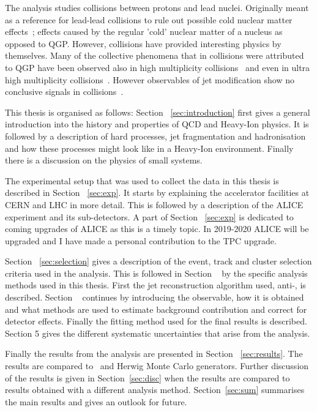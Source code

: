 The analysis studies collisions between protons and lead nuclei. Originally meant as a reference for lead-lead collisions to rule out possible cold nuclear matter effects~\cite{Connors:2017ptx}; effects caused by the regular 'cold' nuclear matter of a nucleus as opposed to QGP. However, \pPb collisions have provided interesting physics by themselves. Many of the collective phenomena that in \PbPb collisions were attributed to QGP have been observed also in high multiplicity \pPb collisions~\cite{Nagle:2018nvi} and even in ultra high multiplicity \pp collisions~\cite{Nagle:2018nvi}. However observables of jet modification show no conclusive signals in \pPb collisions~\cite{Connors:2017ptx,Nagle:2018nvi}. %

This thesis is organised as follows: Section ~\ref{sec:introduction} first gives a general introduction into the history and properties of QCD and Heavy-Ion physics. It is followed by a description of hard processes, jet fragmentation and hadronisation and how these processes might look like in a Heavy-Ion environment. Finally there is a discussion on the physics of small systems.

The experimental setup that was used to collect the data in this thesis is described in Section ~\ref{sec:exp}. It starts by explaining the accelerator facilities at CERN and LHC in more detail. This is followed by a description of the ALICE experiment and its sub-detectors. A part of Section ~\ref{sec:exp} is dedicated to coming upgrades of ALICE as this is a timely topic. In 2019-2020 ALICE will be upgraded and I have made a personal contribution to the TPC upgrade.

Section ~\ref{sec:selection} gives a description of the event, track and cluster selection criteria used in the analysis. This is followed in Section ~\cite{sec:methods} by the specific analysis methods used in this thesis. First the jet reconstruction algorithm used, anti-\kt{}, is described. Section ~\cite{sec:methods} continues by introducing the \jt{} observable, how it is obtained and what methods are used to estimate background contribution and correct for detector effects. Finally the fitting method used for the final results is described. Section 5 gives the different systematic uncertainties that arise from the analysis.

Finally the results from the analysis are presented in Section ~\ref{sec:results}. The results are compared to \pythia~and Herwig Monte Carlo generators. Further discussion of the results is given in Section~\ref{sec:disc} when the results are compared to \jt{} results obtained with a different analysis method. Section~\ref{sec:sum} summarises the main results and gives an outlook for future.


